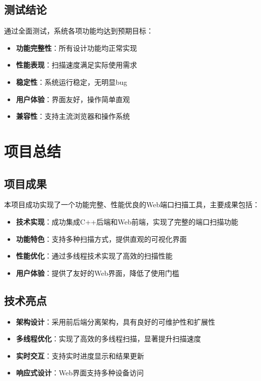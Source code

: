 \documentclass[12pt,hyperref,a4paper,UTF8]{ctexart}
\begin{document}
\subsection{测试结论}
通过全面测试，系统各项功能均达到预期目标：
\begin{itemize}
    \item \textbf{功能完整性}：所有设计功能均正常实现
    \item \textbf{性能表现}：扫描速度满足实际使用需求
    \item \textbf{稳定性}：系统运行稳定，无明显bug
    \item \textbf{用户体验}：界面友好，操作简单直观
    \item \textbf{兼容性}：支持主流浏览器和操作系统
\end{itemize}

\section{项目总结}

\subsection{项目成果}
本项目成功实现了一个功能完整、性能优良的Web端口扫描工具，主要成果包括：

\begin{itemize}
    \item \textbf{技术实现}：成功集成C++后端和Web前端，实现了完整的端口扫描功能
    \item \textbf{功能特色}：支持多种扫描方式，提供直观的可视化界面
    \item \textbf{性能优化}：通过多线程技术实现了高效的扫描性能
    \item \textbf{用户体验}：提供了友好的Web界面，降低了使用门槛
\end{itemize}

\subsection{技术亮点}
\begin{itemize}
    \item \textbf{架构设计}：采用前后端分离架构，具有良好的可维护性和扩展性
    \item \textbf{多线程优化}：实现了高效的多线程扫描，显著提升扫描速度
    \item \textbf{实时交互}：支持实时进度显示和结果更新
    \item \textbf{响应式设计}：Web界面支持多种设备访问
\end{itemize}
\end{document}
